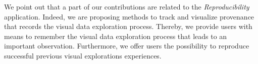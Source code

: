 %
% 
 
%

{\color{Fuchsia}
We point out that a part of our contributions are related to the \emph{Reproducibility} application.
Indeed, we are proposing methods to track and visualize provenance that records the visual data exploration process. Thereby, we provide users with means to remember the visual data exploration process that leads to an important observation. Furthermore, we offer users the possibility to reproduce successful previous visual explorations experiences.
 }



